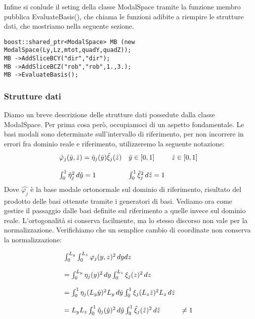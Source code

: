 Infine si conlude il seting della classe ModalSpace tramite la funzione membro pubblica EvaluateBasis(), che chiama le funzioni adibite a riempire le strutture dati, che mostriamo nella seguente sezione.

\begin{lstlisting}[style = general]
boost::shared_ptr<ModalSpace> MB (new ModalSpace(Ly,Lz,mtot,quadY,quadZ));
MB ->AddSliceBCY("dir","dir");
MB ->AddSliceBCZ("rob","rob",1.,3.);
MB ->EvaluateBasis();
\end{lstlisting}

\subsubsection{Strutture dati}
Diamo un breve descrizione delle strutture dati possedute dalla classe ModalSpace. Per prima cosa per\`o, occupiamoci di un aspetto 
fondamentale. Le basi modali sono determinate sull'intervallo di riferimento, per non incorrere in errori fra dominio reale e riferimento,  
utilizzeremo la seguente notazione:
\begin{equation}
\label{eq: notazione}
\begin{array}{l l l}
\hat{\varphi}_j(\hat{y},\hat{z}) = \hat{\eta}_j(\hat{y}) \hat{\xi}_j(\hat{z}) & \hat{y} \in [0,1] & \hat{z} \in [0,1] 
\\
\\
\int_0^1 \hat{\eta}^2_j\,d\hat{y} = 1 & \int_0^1 \hat{\xi}^2_j\,d\hat{z} = 1
\end{array}
\end{equation}
Dove $\hat{\varphi_j}$ \`e la base modale ortonormale sul dominio di riferimento, risultato del prodotto delle basi ottenute tramite i 
generatori di basi.
Vediamo ora come gestire il passaggio dalle basi definite sul riferimento a quelle invece sul dominio reale. L'ortogonalit\`a si conserva 
facilmente, ma lo stesso discorso non vale per la normalizzazione. Verifichiamo che un semplice cambio di coordinate non conserva la 
normalizzazione:

\begin{equation}
\label{eq: trasformazione}
\begin{array}{l l }
\int_0^{L_y}\int_0^{L_z} \varphi_j(y,z)^2 \,dydz 
\\
\\
= \int_0^{L_y} \eta_j(y)^2 \,dy\int_0^{L_z} \xi_j(z)^2 \,dz 
\\
\\
= \int_0^{1} \eta_j(L_y\hat{y})^2 L_y\,d\hat{y} \int_0^{1} \xi_j(L_z\hat{z})^2 L_z\,d\hat{z} 
\\
\\
 = L_yL_z\int_0^{1} \hat{\eta}_j(\hat{y})^2 \,d\hat{y} \int_0^{1} \hat{\xi}_j(\hat{z})^2 \,d\hat{z} & \neq  1  
\end{array}
\end{equation}

